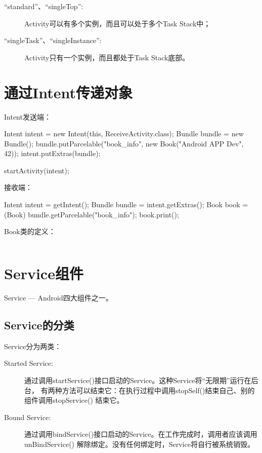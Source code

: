 ﻿\documentclass[a4paper,11pt]{article}
\begin{document}
  \begin{description}
    \item[``standard''、``singleTop'':] Activity可以有多个实例，而且可以处于多个Task Stack中；
    \item[``singleTask''、``singleInstance'':] Activity只有一个实例，而且都处于Task Stack底部。
  \end{description}


  \section[通过Intent传递对象]{通过Intent传递对象}
  Intent发送端：\par
  \begin{javacode}
Intent intent = new Intent(this, ReceiveActivity.class);
Bundle bundle = new Bundle();
bundle.putParcelable("book_info", new Book("Android APP Dev", 42));
intent.putExtras(bundle);

startActivity(intent);
  \end{javacode}

  接收端：\par
  \begin{javacode}
Intent intent = getIntent();
Bundle bundle = intent.getExtras();
Book book = (Book) bundle.getParcelable("book_info");
book.print();
  \end{javacode}

  Book类的定义：\par
  \inputminted[linenos,tabsize=4,bgcolor=srcbg]{java}{ParcableBook.java}


  \section[Service组件]{Service组件}
  Service --- Android四大组件之一。
  
  \subsection[Service的分类]{Service的分类}
  Service分为两类：\par
  \begin{description}
    \item[Started Service:] 通过调用startService()接口启动的Service。这种Service将“无限期”运行在后台，
                            有两种方法可以结束它：在执行过程中调用stopSelf()结束自己、别的组件调用stopService() 结束它。
    \item[Bound Service:] 通过调用bindService()接口启动的Service。在工作完成时，调用者应该调用unBindService()
                          解除绑定。没有任何绑定时，Service将自行被系统销毁。
  \end{description}
  
\end{document}
